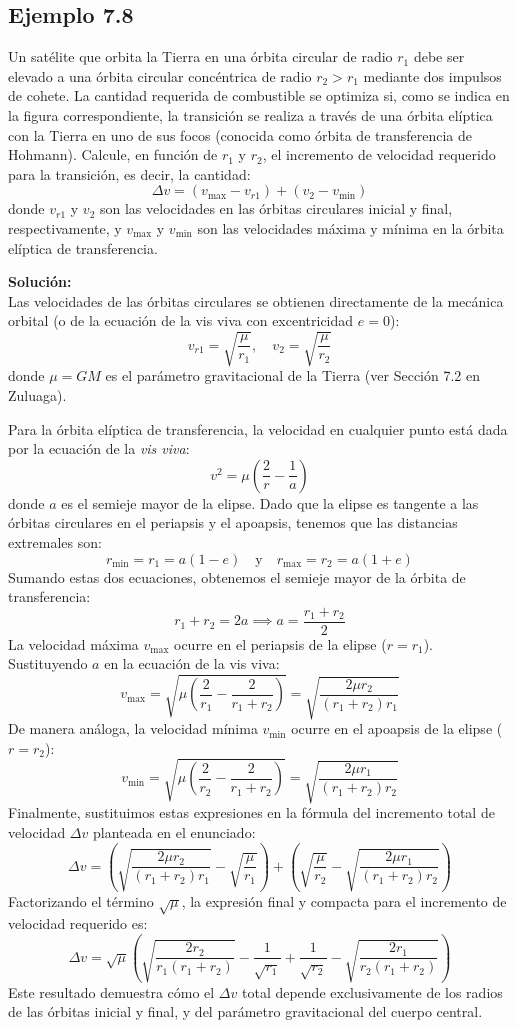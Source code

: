 \documentclass[a4paper]{article}
\begin{document}
\subsection{Ejemplo 7.8}

Un satélite que orbita la Tierra en una órbita circular de radio $r_1$ debe ser elevado a una órbita circular concéntrica de radio $r_2 > r_1$ mediante dos impulsos de cohete. La cantidad requerida de combustible se optimiza si, como se indica en la figura correspondiente, la transición se realiza a través de una órbita elíptica con la Tierra en uno de sus focos (conocida como órbita de transferencia de Hohmann). Calcule, en función de $r_1$ y $r_2$, el incremento de velocidad requerido para la transición, es decir, la cantidad:
$$
\Delta v = (v_{\max} - v_{r1}) + (v_2 - v_{\min})
$$
donde $v_{r1}$ y $v_2$ son las velocidades en las órbitas circulares inicial y final, respectivamente, y $v_{\max}$ y $v_{\min}$ son las velocidades máxima y mínima en la órbita elíptica de transferencia.

\textbf{Solución:} \\
Las velocidades de las órbitas circulares se obtienen directamente de la mecánica orbital (o de la ecuación de la vis viva con excentricidad $e=0$):
$$
v_{r1} = \sqrt{\frac{\mu}{r_1}}, \quad v_2 = \sqrt{\frac{\mu}{r_2}}
$$
donde $\mu = GM$ es el parámetro gravitacional de la Tierra (ver Sección 7.2 en Zuluaga).

Para la órbita elíptica de transferencia, la velocidad en cualquier punto está dada por la ecuación de la \textit{vis viva}:
$$
v^2 = \mu \left( \frac{2}{r} - \frac{1}{a} \right)
$$
donde $a$ es el semieje mayor de la elipse. Dado que la elipse es tangente a las órbitas circulares en el periapsis y el apoapsis, tenemos que las distancias extremales son:
$$
r_{\min} = r_1 = a(1-e) \quad \text{y} \quad r_{\max} = r_2 = a(1+e)
$$
Sumando estas dos ecuaciones, obtenemos el semieje mayor de la órbita de transferencia:
$$
r_1 + r_2 = 2a \implies a = \frac{r_1 + r_2}{2}
$$
La velocidad máxima $v_{\max}$ ocurre en el periapsis de la elipse ($r = r_1$). Sustituyendo $a$ en la ecuación de la vis viva:
$$
v_{\max} = \sqrt{\mu \left( \frac{2}{r_1} - \frac{2}{r_1 + r_2} \right)} = \sqrt{\frac{2\mu r_2}{(r_1 + r_2)r_1}}
$$
De manera análoga, la velocidad mínima $v_{\min}$ ocurre en el apoapsis de la elipse ($r = r_2$):
$$
v_{\min} = \sqrt{\mu \left( \frac{2}{r_2} - \frac{2}{r_1 + r_2} \right)} = \sqrt{\frac{2\mu r_1}{(r_1 + r_2)r_2}}
$$
Finalmente, sustituimos estas expresiones en la fórmula del incremento total de velocidad $\Delta v$ planteada en el enunciado:
$$
\Delta v = \left( \sqrt{\frac{2\mu r_2}{(r_1 + r_2)r_1}} - \sqrt{\frac{\mu}{r_1}} \right) + \left( \sqrt{\frac{\mu}{r_2}} - \sqrt{\frac{2\mu r_1}{(r_1 + r_2)r_2}} \right)
$$
Factorizando el término $\sqrt{\mu}$, la expresión final y compacta para el incremento de velocidad requerido es:
$$
\Delta v = \sqrt{\mu} \left( \sqrt{\frac{2r_2}{r_1(r_1 + r_2)}} - \frac{1}{\sqrt{r_1}} + \frac{1}{\sqrt{r_2}} - \sqrt{\frac{2r_1}{r_2(r_1 + r_2)}} \right)
$$
Este resultado demuestra cómo el $\Delta v$ total depende exclusivamente de los radios de las órbitas inicial y final, y del parámetro gravitacional del cuerpo central.


 
\end{document}
